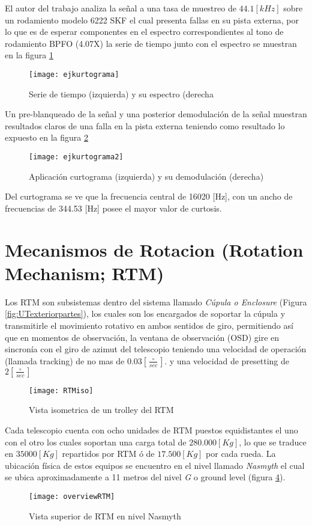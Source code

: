     			El autor del trabajo analiza la señal a una tasa de muestreo de $44.1 [kHz]$ sobre un rodamiento modelo 6222 SKF el cual presenta fallas en su pista externa, por lo que es de esperar componentes en el espectro correspondientes al tono de rodamiento BPFO (4.07X)
    			la serie de tiempo junto con el espectro se muestran en la figura \ref{fig:ejkurtograma}
    			\begin{figure}
    			    \centering
    			    \texttt{[image: ejkurtograma]}
    			    \caption{Serie de tiempo (izquierda) y su espectro (derecha}
    			    \label{fig:ejkurtograma}
    			\end{figure}
    			Un pre-blanqueado de la señal y una posterior demodulación de la señal muestran resultados claros de una falla en la pista externa teniendo como resultado lo expuesto en la figura \ref{fig:ejkurtograma2}
    			\begin{figure}[H]
    			    \centering
    			    \texttt{[image: ejkurtograma2]}
    			    \caption{Aplicación curtograma (izquierda) y su demodulación (derecha)}
    			    \label{fig:ejkurtograma2}
    			\end{figure}
    			Del curtograma se ve que la frecuencia central de 16020 [Hz], con un ancho de frecuencias de 344.53 [Hz] posee el mayor valor de curtosis.
    \section{Mecanismos de Rotacion (Rotation Mechanism; RTM)}
        Los RTM son subsistemas dentro del sistema llamado \textit{Cúpula o Enclosure} (Figura \ref{fig:UTexteriorpartes}), los cuales son los encargados de soportar la cúpula y transmitirle el movimiento rotativo en ambos sentidos de giro, permitiendo así que en momentos de observación, la ventana de observación (OSD) gire en sincronía con el giro de azimut del telescopio teniendo una velocidad de operación (llamada tracking) de no mas de $0.03 \left[\frac{\circ}{sec}\right]$. y una velocidad de presetting de $2 \left[\frac{\circ}{sec}\right]$
        
        \begin{figure}[H]
            \centering
            \texttt{[image: RTMiso]}
            \caption{Vista isometrica de un trolley del RTM}
            \label{fig:RTMiso}
        \end{figure}
        
        Cada telescopio cuenta con ocho unidades de RTM puestos equidistantes el uno con el otro los cuales soportan una carga total de $280.000 [Kg]$, lo que se traduce en $35000 [Kg]$ repartidos por RTM ó de $17.500 [Kg]$ por cada rueda. La ubicación física de estos equipos se encuentro en el nivel llamado \textit{Nasmyth} el cual se ubica aproximadamente a 11 metros del nivel \textit{G} o ground level (figura \ref{fig:topRTM}).
        \begin{figure}
            \centering
            \texttt{[image: overviewRTM]}
            \caption{Vista superior de RTM en nivel Nasmyth}
            \label{fig:topRTM}
        \end{figure}
